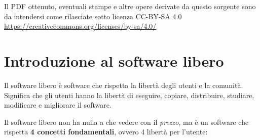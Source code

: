 \noindent Il PDF ottenuto, eventuali stampe e altre opere derivate da questo sorgente sono da intendersi come rilasciate sotto licenza CC-BY-SA 4.0 \\
\url{https://creativecommons.org/licenses/by-sa/4.0/}


\section{Introduzione al software libero}

Il software libero è software che rispetta la libertà degli utenti e la comunità. Significa che gli utenti hanno la libertà di eseguire, copiare, distribuire, studiare, modificare e migliorare il software.

Il software libero non ha nulla a che vedere con il \textit{prezzo}, ma è un software che rispetta \textbf{4 concetti fondamentali}, ovvero 4 libertà per l'utente:

